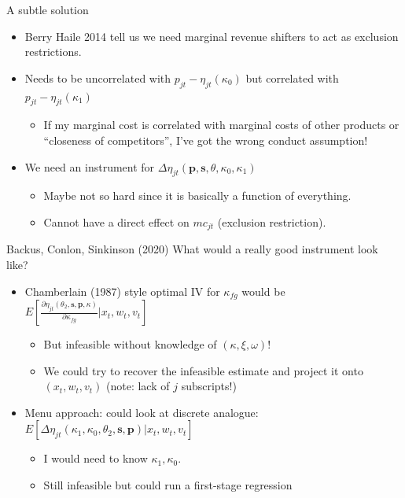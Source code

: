 \documentclass[xcolor=pdftex,dvipsnames,table,mathserif,aspectratio=169]{beamer}
\begin{document}
\begin{frame}{A subtle solution}
\begin{itemize}
\item Berry Haile 2014 tell us we need \alert{marginal revenue shifters} to act as \alert{exclusion restrictions}.
\item Needs to be uncorrelated with $p_{jt}-\eta_{jt}(\kappa_0)$ but correlated with $p_{jt}-\eta_{jt}(\kappa_1)$
\begin{itemize}
\item If my marginal cost is correlated with marginal costs of other products or ``closeness of competitors'', I've got the wrong conduct assumption!
\end{itemize}
\item We need an instrument for $\Delta \eta_{jt}(\mathbf{p},\mathbf{s},\theta,\kappa_0,\kappa_1)$
\begin{itemize}
\item Maybe not so hard since it is basically a function of everything.
\item Cannot have a direct effect on $mc_{jt}$ (exclusion restriction).
\end{itemize}
\end{itemize}
\end{frame}



\begin{frame}{Backus, Conlon, Sinkinson (2020)}
What would a really good instrument look like?
\begin{itemize}
\item Chamberlain (1987) style optimal IV for $\kappa_{fg}$ would be $E\left[\frac{\partial \eta_{jt}(\theta_2,\mathbf{s},\mathbf{p},\kappa)}{\partial \kappa_{fg}} | x_{t}, w_{t}, v_{t}\right]$
\begin{itemize}
\item But infeasible without knowledge of $(\kappa,\xi,\omega)$!
\item We could try to recover the infeasible estimate and project it onto $(x_t,w_t,v_t)$ (note: lack of $j$ subscripts!)
\end{itemize}
\item Menu approach: could look at discrete analogue: $E\left[\Delta \eta_{jt}(\kappa_1,\kappa_0,\theta_2,\mathbf{s},\mathbf{p}) | x_{t}, w_{t}, v_{t}\right]$
\begin{itemize}
\item I would need to know $\kappa_1,\kappa_0$.
\item Still infeasible but could run a first-stage regression
\end{itemize}
\end{itemize}
\end{frame}
\end{document}
